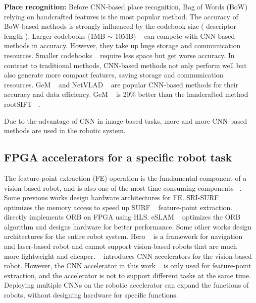 \textbf{Place recognition:} Before CNN-based place recognition, Bag of Words (BoW)  ~\cite{small_1} relying on handcrafted features is the most popular method. The accuracy of BoW-based methods is strongly influenced by the codebook size ( descriptor length ). Larger codebooks (1MB $\sim$ 10MB)  ~\cite{large_1, large_2} can compete with CNN-based methods in accuracy. However, they take up huge storage and communication resources. Smaller codebooks ~\cite{small_1, small_2, jegou2014triang} require less space but get worse accuracy. In contrast to traditional methods, CNN-based methods not only perform well but also generate more compact features, saving storage and communication resources. GeM  ~\cite{radenovic2018fine} and NetVLAD  ~\cite{arandjelovic2016netvlad} are popular CNN-based methods for their accuracy and data efficiency. GeM  ~\cite{radenovic2018fine} is 20\% better than the handcrafted method rootSIFT  ~\cite{jegou2014triang}.

Due to the advantage of CNN in image-based tasks, more and more CNN-based methods are used in the robotic system.


\subsection{ FPGA accelerators for a specific robot task }

The feature-point extraction (FE) operation is the fundamental component of a vision-based robot, and is also one of the most time-consuming components  ~\cite{fang2017fpga}.
Some previous works design hardware architectures for FE.
SRI-SURF  ~\cite{jia2016sri} optimizes the memory access to speed up SURF  ~\cite{bay2006surf} feature-point extraction. 
~\cite{fang2017fpga} directly implements ORB on FPGA using HLS. eSLAM ~\cite{liu2019eslam} optimizes the ORB algorithm and designs hardware for better performance.
Some other works design architectures for the entire robot system. Hero  ~\cite{shi2018hero} is a framework for navigation and laser-based robot and cannot support vision-based robots that are much more lightweight and cheaper. 
~\cite{li2019879gops} introduces CNN accelerators for the vision-based robot. 
However, the CNN accelerator in this work ~\cite{li2019879gops} is only used for feature-point extraction, and the accelerator is not to support different tasks at the same time. 
Deploying multiple CNNs on the robotic accelerator can expand the functions of robots, without designing hardware for specific functions.



